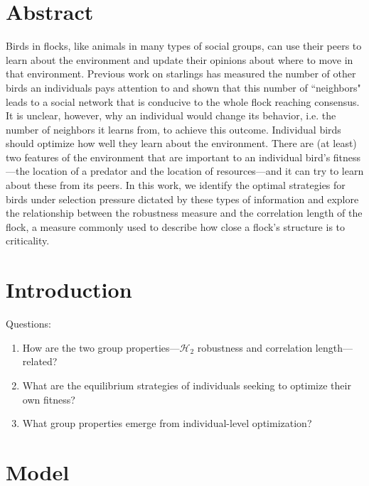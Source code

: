 \documentclass{article}
\begin{document}
%

\tableofcontents

\section{Abstract}
Birds in flocks, like animals in many types of social groups, can use their peers to learn about the environment and update their opinions about where to move in that environment.  Previous work on starlings has measured the number of other birds an individuals pays attention to and shown that this number of ``neighbors" leads to a social network that is conducive to the whole flock reaching consensus.  It is unclear, however, why an individual would change its behavior, i.e. the number of neighbors it learns from, to achieve this outcome.  Individual birds should optimize how well they learn about the environment. There are (at least) two features of the environment that are important to an individual bird's fitness---the location of a predator and the location of resources---and it can try to learn about these from its peers. In this work, we identify the optimal strategies for birds under selection pressure dictated by these types of information and explore the relationship between the robustness measure and the correlation length of the flock, a measure commonly used to describe how close a flock's structure is to criticality.

\section{Introduction }
Questions:
\begin{enumerate}
\item How are the two group properties---$\mathscr{H}_2$ robustness and correlation length---related?
\item What are the equilibrium strategies of individuals seeking to optimize their own fitness?
\item What group properties emerge from individual-level optimization?
\end{enumerate}


\section{Model }
\end{document}
